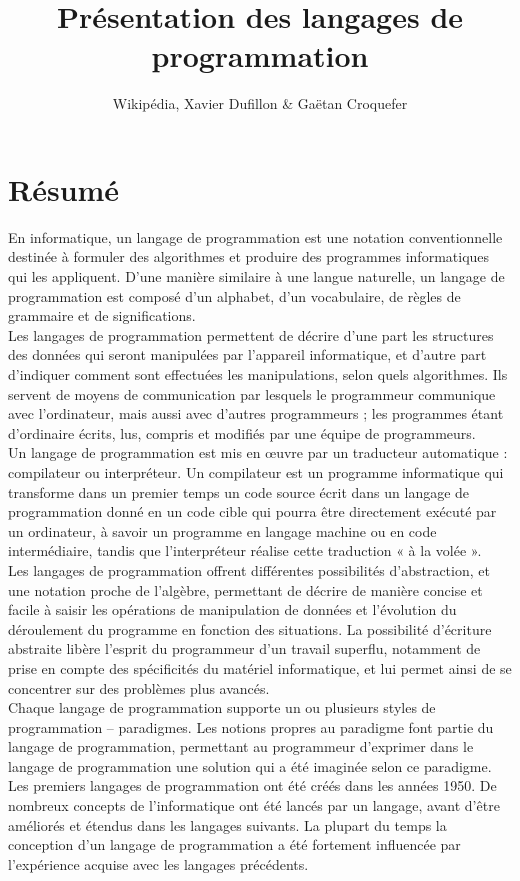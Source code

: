 \documentclass[a4paper,12pt]{article}
\title{Présentation des langages de programmation}
\author{Wikipédia, Xavier Dufillon \& Gaëtan Croquefer}
\begin{document}
\maketitle
\newpage

\renewcommand{\contentsname}{Sommaire}
\tableofcontents
\newpage
\listoffigures
\newpage

\setlength{\parindent}{0em}
\section{Résumé}

En informatique, un langage de programmation est une notation conventionnelle destinée à formuler des algorithmes et produire des programmes informatiques qui les appliquent. D'une manière similaire à une langue naturelle, un langage de programmation est composé d'un alphabet, d'un vocabulaire, de règles de grammaire et de significations.\cite{maurizio} \cite{kenneth}\\
Les langages de programmation permettent de décrire d'une part les structures des données qui seront manipulées par l'appareil informatique, et d'autre part d'indiquer comment sont effectuées les manipulations, selon quels algorithmes. Ils servent de moyens de communication par lesquels le programmeur communique avec l'ordinateur, mais aussi avec d'autres programmeurs ; les programmes étant d'ordinaire écrits, lus, compris et modifiés par une équipe de programmeurs.\cite{william}\\
Un langage de programmation est mis en œuvre par un traducteur automatique : compilateur ou interpréteur. Un compilateur est un programme informatique qui transforme dans un premier temps un code source écrit dans un langage de programmation donné en un code cible qui pourra être directement exécuté par un ordinateur, à savoir un programme en langage machine ou en code intermédiaire\cite{kenneth}, tandis que l'interpréteur réalise cette traduction « à la volée ».\\
Les langages de programmation offrent différentes possibilités d'abstraction, et une notation proche de l'algèbre, permettant de décrire de manière concise et facile à saisir les opérations de manipulation de données et l'évolution du déroulement du programme en fonction des situations. La possibilité d'écriture abstraite libère l'esprit du programmeur d'un travail superflu, notamment de prise en compte des spécificités du matériel informatique, et lui permet ainsi de se concentrer sur des problèmes plus avancés.\cite{kenneth}\\
Chaque langage de programmation supporte un ou plusieurs styles de programmation – paradigmes. Les notions propres au paradigme font partie du langage de programmation, permettant au programmeur d'exprimer dans le langage de programmation une solution qui a été imaginée selon ce paradigme.
Les premiers langages de programmation ont été créés dans les années 1950. De nombreux concepts de l'informatique ont été lancés par un langage, avant d'être améliorés et étendus dans les langages suivants. La plupart du temps la conception d'un langage de programmation a été fortement influencée par l'expérience acquise avec les langages précédents.\cite{watt}
\end{document}
